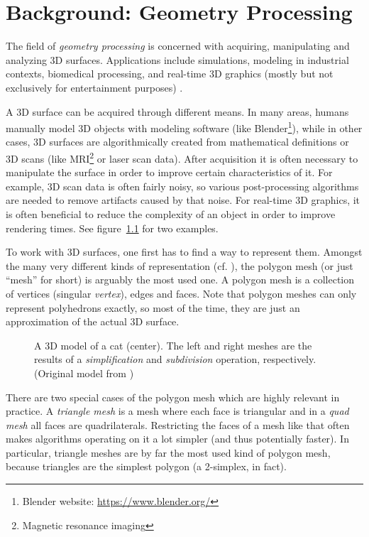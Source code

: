 \newlength{\origtabcolsep}
\setlength{\origtabcolsep}{\tabcolsep}


\chapter{Background: Geometry Processing}

The field of \emph{geometry processing} is concerned with acquiring, manipulating and analyzing 3D surfaces.
Applications include simulations, modeling in industrial contexts, biomedical processing, and real-time 3D graphics (mostly but not exclusively for entertainment purposes) \cite{wikigeometryproc, botsch2010polygon}.

A 3D surface can be acquired through different means.
In many areas, humans manually model 3D objects with modeling software (like Blender\footnote{Blender website: \url{https://www.blender.org/}}), while in other cases, 3D surfaces are algorithmically created from mathematical definitions or 3D scans (like MRI\footnote{Magnetic resonance imaging} or laser scan data).
After acquisition it is often necessary to manipulate the surface in order to improve certain characteristics of it.
For example, 3D scan data is often fairly noisy, so various post-processing algorithms are needed to remove artifacts caused by that noise.
For real-time 3D graphics, it is often beneficial to reduce the complexity of an object in order to improve rendering times.
See figure~\ref{fig:cat-algo} for two examples.

To work with 3D surfaces, one first has to find a way to represent them.
Amongst the many very different kinds of representation (cf. \cite[Chapter~1]{botsch2010polygon}), the polygon mesh (or just \enquote{mesh} for short) is arguably the most used one.
A polygon mesh is a collection of vertices (singular \emph{vertex}), edges and faces.
Note that polygon meshes can only represent polyhedrons exactly, so most of the time, they are just an approximation of the actual 3D surface.

\begin{figure}[b]
  
  \caption{A 3D model of a cat (center).
  The left and right meshes are the results of a \emph{simplification} and \emph{subdivision} operation, respectively.
  (Original model from \cite{catmodel})}
  \label{fig:cat-algo}
\end{figure}

There are two special cases of the polygon mesh which are highly relevant in practice.
A \emph{triangle mesh} is a mesh where each face is triangular and in a \emph{quad mesh} all faces are quadrilaterals.
Restricting the faces of a mesh like that often makes algorithms operating on it a lot simpler (and thus potentially faster).
In particular, triangle meshes are by far the most used kind of polygon mesh, because triangles are the simplest polygon (a 2-simplex, in fact).

